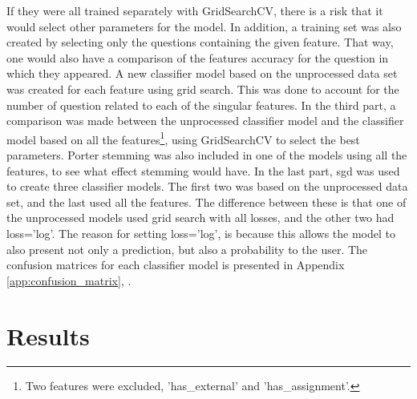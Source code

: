 If they were all trained separately with GridSearchCV, there is a risk that it would select other parameters for the model.
In addition, a training set was also created by selecting only the questions containing the given feature.
That way, one would also have a comparison of the features accuracy for the question in which they appeared.
A new classifier model based on the unprocessed data set was created for each feature using grid search. 
This was done to account for the number of question related to each of the singular features. 
\clearpage\noindent
In the third part, a comparison was made between the unprocessed classifier model and the classifier model based on all the features\footnote{
	Two features were excluded, 'has\_external' and 'has\_assignment'.
}, using GridSearchCV to select the best parameters.
Porter stemming was also included in one of the models using all the features, to see what effect stemming would have. 
\vspace{0.5em}\newline
In the last part, \gls{sgd} was used to create three classifier models.
The first two was based on the unprocessed data set, and the last used all the features.
The difference between these is that one of the unprocessed models used grid search with all losses, and the other two had loss='log'.
The reason for setting loss='log', is because this allows the model to also present not only a prediction, but also a probability to the user.
The confusion matrices for each classifier model is presented in Appendix \ref{app:confusion_matrix}, \pageref{app:confusion_matrix}.

\section{Results}
\label{sec:results}


